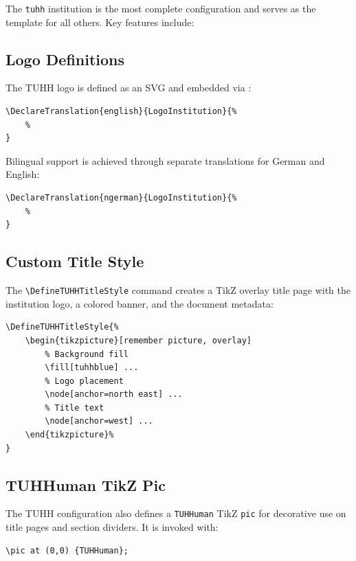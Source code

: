 The \texttt{tuhh} institution is the most complete configuration and serves as
the template for all others. Key features include:

\subsection{Logo Definitions}

The TUHH logo is defined as an SVG and embedded via \verb||:

\begin{verbatim}
\DeclareTranslation{english}{LogoInstitution}{%
    %
}
\end{verbatim}

Bilingual support is achieved through separate translations for German and
English:

\begin{verbatim}
\DeclareTranslation{ngerman}{LogoInstitution}{%
    %
}
\end{verbatim}

\subsection{Custom Title Style}

The \verb|\DefineTUHHTitleStyle| command creates a TikZ overlay title page
with the institution logo, a colored banner, and the document metadata:

\begin{verbatim}
\DefineTUHHTitleStyle{%
    \begin{tikzpicture}[remember picture, overlay]
        % Background fill
        \fill[tuhhblue] ...
        % Logo placement
        \node[anchor=north east] ...
        % Title text
        \node[anchor=west] ...
    \end{tikzpicture}%
}
\end{verbatim}

\subsection{TUHHuman TikZ Pic}

The TUHH configuration also defines a \verb|TUHHuman| TikZ \verb|pic| for
decorative use on title pages and section dividers. It is invoked with:

\begin{verbatim}
\pic at (0,0) {TUHHuman};
\end{verbatim}

